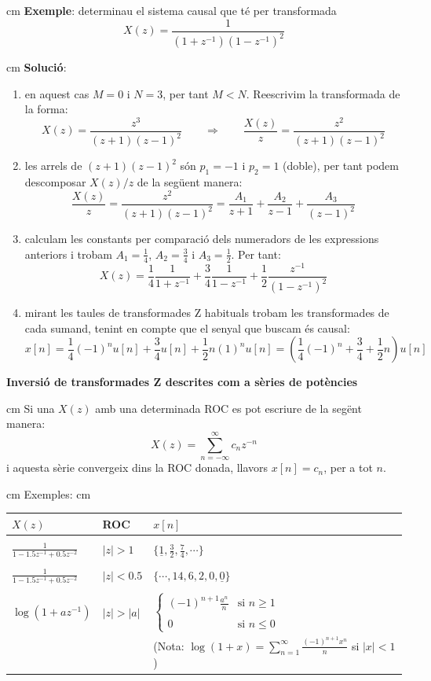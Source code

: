 \documentclass{article}
\begin{document}
\begin{enumerate}
\begin{enumerate}
\end{enumerate}

\end{enumerate}


 cm
\noindent
\textbf{Exemple}: determinau el sistema causal que t\'e per transformada 
\[
X(z)=\frac{1}{(1+z^{-1})(1-z^{-1})^2}
\]

 cm
\noindent
\textbf{Soluci\'o}:
\begin{enumerate}
\item en aquest cas $M=0$ i $N=3$, per tant $M < N$. Reescrivim la transformada de
la forma:
\[
X(z)=\frac{z^3}{(z+1)(z-1)^2} \qquad \Longrightarrow \qquad \frac{X(z)}{z}=\frac{z^2}{(z+1)(z-1)^2}
\]
\item les arrels de $(z+1)(z-1)^2$ s\'on $p_1=-1$ i $p_2=1$ (doble), per tant podem descomposar $X(z)/z$
de la seg\"uent manera:
\[
\frac{X(z)}{z}=\frac{z^2}{(z+1)(z-1)^2}=\frac{A_1}{z+1}+\frac{A_2}{z-1}+\frac{A_3}{(z-1)^2}
\]
\item calculam les constants per comparaci\'o dels numeradors de les expressions anteriors i trobam 
$A_1=\frac{1}{4}$, $A_2=\frac{3}{4}$ i $A_3=\frac{1}{2}$. Per tant:
\[
X(z)=\frac{1}{4} \frac{1}{1+z^{-1}} + \frac{3}{4} \frac{1}{1-z^{-1}} + \frac{1}{2} \frac{z^{-1}}{(1-z^{-1})^2} 
\]
\item mirant les taules de transformades Z habituals trobam les transformades de cada sumand, tenint
en compte que el senyal que buscam \'es causal:
\[
x[n]=\frac{1}{4} (-1)^nu[n] + \frac{3}{4} u[n] + \frac{1}{2} n (1)^n u[n] = 
\left( \frac{1}{4} (-1)^n + \frac{3}{4} + \frac{1}{2} n \right) u[n]
\]
\end{enumerate}

\vskip 1cm
\noindent
\textbf{Inversi\'o de transformades Z descrites com a s\`eries de pot\`encies}

 cm
\noindent
Si una $X(z)$ amb una determinada ROC es pot escriure de la seg\"ent manera:
\[
X(z)=\sum_{n=-\infty}^{\infty} c_n z^{-n}
\]
\noindent
i aquesta s\`erie convergeix dins la ROC donada, llavors $x[n]=c_n$, per a tot $n$.

 cm
\noindent
Exemples:
 cm
\begin{tabular}{l|l|l}
$X(z)$ & ROC & $x[n]$ \\ \hline & & \\
$\frac{1}{1-1.5z^{-1}+0.5z^{-2}}$ & $|z|>1$ & $\{\underline{1}, \frac{3}{2}, \frac{7}{4}, \cdots \}$ \\ \hline & & \\
$\frac{1}{1-1.5z^{-1}+0.5z^{-2}}$ & $|z|<0.5$ & $\{ \cdots, 14, 6, 2, 0, \underline{0} \}$ \\ \hline & & \\
$\log(1+az^{-1})$ & $|z|>|a|$ & $\begin{cases} (-1)^{n+1} \frac{a^n}{n} & \text{si }n \geq 1 \\ \\ 0 & \text{si } n \leq 0 \end{cases}$
\\ & & (Nota: $\log(1+x)=\sum_{n=1}^\infty \frac{ (-1)^{n+1} x^n}{n}$ si $|x|<1$)
\end{tabular}
\end{document}

